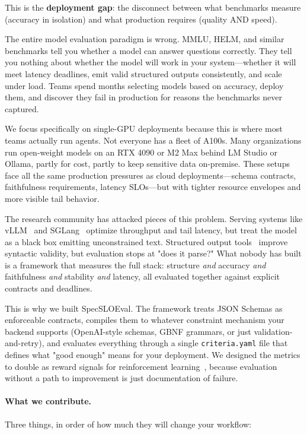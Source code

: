 \documentclass[11pt]{article}
\begin{document}
This is the \textbf{deployment gap}: the disconnect between what benchmarks measure (accuracy in isolation) and what production requires (quality AND speed).

The entire model evaluation paradigm is wrong.
MMLU, HELM, and similar benchmarks tell you whether a model can answer questions correctly.
They tell you nothing about whether the model will work in your system---whether it will meet latency deadlines, emit valid structured outputs consistently, and scale under load.
Teams spend months selecting models based on accuracy, deploy them, and discover they fail in production for reasons the benchmarks never captured.

We focus specifically on single-GPU deployments because this is where most teams actually run agents.
Not everyone has a fleet of A100s.
Many organizations run open-weight models on an RTX 4090 or M2 Max behind LM Studio or Ollama, partly for cost, partly to keep sensitive data on-premise.
These setups face all the same production pressures as cloud deployments---schema contracts, faithfulness requirements, latency SLOs---but with tighter resource envelopes and more visible tail behavior.

The research community has attacked pieces of this problem.
Serving systems like vLLM~\citep{kwon2023vllm} and SGLang~\citep{zheng2023sglang} optimize throughput and tail latency, but treat the model as a black box emitting unconstrained text.
Structured output tools~\citep{geng2025jsonschemabench,openaiStructuredOutputs} improve syntactic validity, but evaluation stops at "does it parse?"
What nobody has built is a framework that measures the full stack: structure \emph{and} accuracy \emph{and} faithfulness \emph{and} stability \emph{and} latency, all evaluated together against explicit contracts and deadlines.

This is why we built SpecSLOEval.
The framework treats JSON Schemas as enforceable contracts, compiles them to whatever constraint mechanism your backend supports (OpenAI-style schemas, GBNF grammars, or just validation-and-retry), and evaluates everything through a single \texttt{criteria.yaml} file that defines what "good enough" means for your deployment.
We designed the metrics to double as reward signals for reinforcement learning~\citep{schulman2017ppo,dettmers2023qlora}, because evaluation without a path to improvement is just documentation of failure.

\paragraph{What we contribute.}
Three things, in order of how much they will change your workflow:
\end{document}
